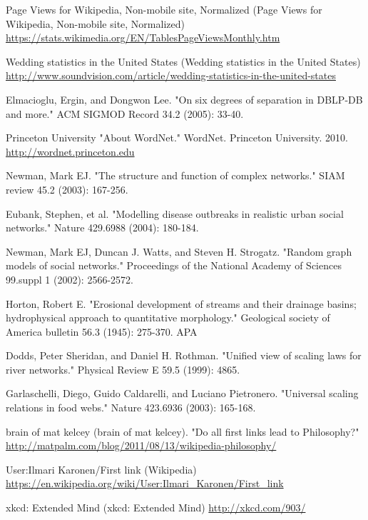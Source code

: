 \documentclass[pre,twocolumn,twoside,superscriptaddress,floatfix, aps, 10pt]{revtex4-1}
\begin{document}
\begin{thebibliography}{1}
     Page Views for Wikipedia, Non-mobile site, Normalized (Page Views for Wikipedia, Non-mobile site, Normalized)
    \url{https://stats.wikimedia.org/EN/TablesPageViewsMonthly.htm}

     Wedding statistics in the United States (Wedding statistics in the United States)
    \url{http://www.soundvision.com/article/wedding-statistics-in-the-united-states}

     Elmacioglu, Ergin, and Dongwon Lee. "On six degrees of separation in DBLP-DB and more." ACM SIGMOD Record 34.2 (2005): 33-40.

     Princeton University "About WordNet." WordNet. Princeton University. 2010. 
    \url{http://wordnet.princeton.edu}

     Newman, Mark EJ. "The structure and function of complex networks." SIAM review 45.2 (2003): 167-256.

     Eubank, Stephen, et al. "Modelling disease outbreaks in realistic urban social networks." Nature 429.6988 (2004): 180-184.

     Newman, Mark EJ, Duncan J. Watts, and Steven H. Strogatz. "Random graph models of social networks." Proceedings of the National Academy of Sciences 99.suppl 1 (2002): 2566-2572.

     Horton, Robert E. "Erosional development of streams and their drainage basins; hydrophysical approach to quantitative morphology." Geological society of America bulletin 56.3 (1945): 275-370.
    APA

     Dodds, Peter Sheridan, and Daniel H. Rothman. "Unified view of scaling laws for river networks." Physical Review E 59.5 (1999): 4865.

     Garlaschelli, Diego, Guido Caldarelli, and Luciano Pietronero. "Universal scaling relations in food webs." Nature 423.6936 (2003): 165-168.
    
     brain of mat kelcey (brain of mat kelcey). 
    "Do all first links lead to Philosophy?"
    \url{http://matpalm.com/blog/2011/08/13/wikipedia-philosophy/}

     User:Ilmari Karonen/First link (Wikipedia)
    \url{https://en.wikipedia.org/wiki/User:Ilmari_Karonen/First_link}

     xkcd: Extended Mind (xkcd: Extended Mind)
    \url{http://xkcd.com/903/}


\end{thebibliography}
\end{document}
